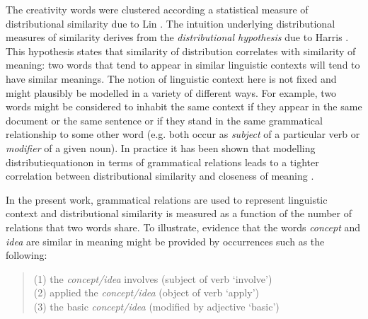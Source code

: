 \documentclass[10pt,letterpaper]{article}
\begin{document}
The creativity words were clustered according  a statistical measure of distributional similarity due to Lin \cite{lin98}. The intuition underlying distributional measures of similarity derives from the {\em distributional hypothesis\/} due to Harris \cite{harris68}. This hypothesis  states that similarity of distribution correlates with similarity of meaning: two words that tend to appear in similar linguistic contexts will tend to have similar meanings. The notion of linguistic context here is not fixed and might plausibly be modelled in a variety of different ways. For example, two words might be considered to inhabit the same context if they appear in the same document or the same sentence or if they stand in the same grammatical relationship to some other word (e.g. both occur as {\em subject\/} of a particular verb or {\em modifier\/} of a given noun). In practice it has been shown that modelling distributiequationon in terms of grammatical relations leads to a tighter correlation between distributional similarity and closeness of meaning \cite{kilgarriff00}. 

In the present work, grammatical relations are used to represent linguistic context  and distributional similarity is measured as a function of the number of  relations 
that two words share. To illustrate, evidence that the words {\em concept} and {\em idea} are similar in meaning might be provided by occurrences such as the following: 

\begin{quote}
(1) the {\em concept/idea} involves \hfill (subject of verb `involve')\\
(2) applied the {\em concept/idea\/} \hfill (object of verb `apply') \\
(3) the basic {\em concept/idea\/} \hfill (modified by adjective `basic')
\end{quote}
\end{document}
